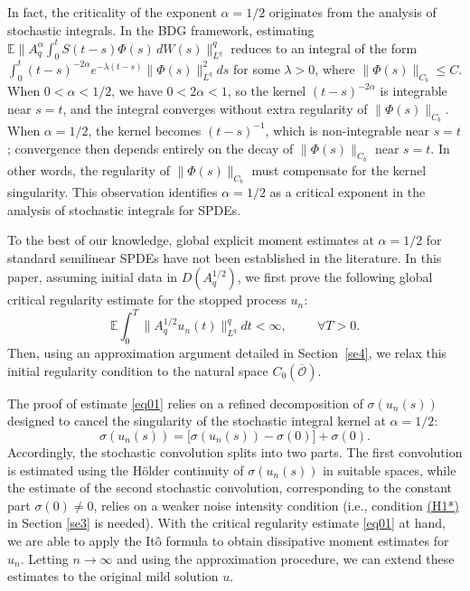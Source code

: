\documentclass[10pt]{article}
\numberwithin{figure}{section}
\numberwithin{equation}{section}
\newcommand{\0}{{\theta}}
\def\8{\infty}
\def\Hs{\hspace{1cm}}\def\hs{\hspace{0.5cm}}
\begin{document}
In fact, the criticality of the exponent $\alpha = 1/2$ originates from the analysis of stochastic integrals. In the BDG framework, estimating $\mathbb{E}\|A_q^\alpha \int_0^t S(t-s)\Phi(s) \, dW(s)\|_{L^q}^q$ reduces to an integral of the form $\int_0^t (t-s)^{-2\alpha} e^{-\lambda (t-s)} \|\Phi(s)\|_{L^q}^2 ds$ for some $\lambda>0$, where $\|\Phi(s)\|_{C_b} \le C$. 
When $0 < \alpha < 1/2$, we have $0 < 2\alpha < 1$, so the kernel $(t-s)^{-2\alpha}$ is integrable near $s=t$, and the integral converges without extra regularity of $\|\Phi(s)\|_{C_b}$. When $\alpha = 1/2$, the kernel becomes $(t-s)^{-1}$, which is non-integrable near $s=t$; convergence then depends entirely on the decay of $\|\Phi(s)\|_{C_b}$ near $s=t$. 
In other words, the regularity of $\|\Phi(s)\|_{C_b}$ must compensate for the kernel singularity. This observation identifies $\alpha = 1/2$ as a critical exponent in the analysis of stochastic integrals for SPDEs.

To the best of our knowledge, global explicit moment estimates at $\alpha = 1/2$ for standard semilinear SPDEs have not been established in the literature. In this paper, assuming initial data in $D(A_q^{1/2})$, we first prove the following global critical regularity estimate for the stopped process $u_n$:
\begin{equation}\label{eq01}
\mathbb{E}\int_0^T\|A_q^{1/2}u_n(t)\|_{L^q}^qdt <\8, \Hs \forall T>0.
\end{equation} Then, using an approximation argument detailed in Section~\ref{se4}, we relax this initial regularity condition to the natural space $C_0(\overline{\mathcal{O}})$.

The proof of estimate \eqref{eq01} relies on a refined decomposition of $\sigma(u_n(s))$ designed to cancel the singularity of the stochastic integral kernel at $\alpha = 1/2$:
$$
\sigma(u_n(s)) = \bigl[\sigma(u_n(s))-\sigma(0)\bigr] + \sigma(0).
$$
Accordingly, the stochastic convolution splits into two parts. The first convolution is estimated using the H\"older continuity of $\sigma(u_n(s))$ in suitable spaces, while the estimate of the second stochastic convolution, corresponding to the constant part $\sigma(0)\neq 0$, relies on a weaker noise intensity condition (i.e., condition \hyperref[H1*]{(H1*)} in Section \ref{se3} is needed). With the critical regularity estimate \eqref{eq01} at hand, we are able to apply the It\^o formula to obtain dissipative moment estimates for $u_n$.  Letting $n \to \infty$ and using the approximation procedure, we can extend these estimates to the original mild solution $u$.
\end{document}
